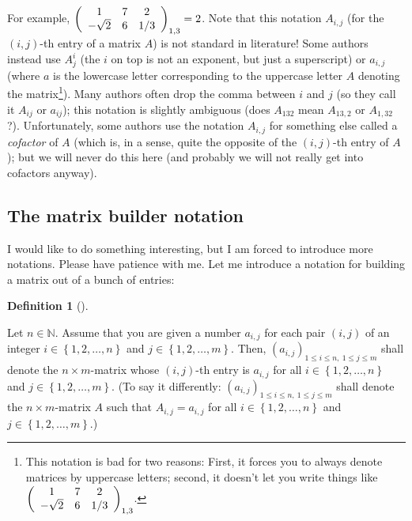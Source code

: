 \documentclass[numbers=enddot,12pt,final,onecolumn,notitlepage]{scrartcl}%
\theoremstyle{definition}
\newtheorem{defi}[theo]{Definition}
\newenvironment{definition}[1][]
{\begin{defi}[#1]\begin{leftbar}}
{\end{leftbar}\end{defi}}
\begin{document}
For example, $\left(
\begin{array}
[c]{ccc}%
1 & 7 & 2\\
-\sqrt{2} & 6 & 1/3
\end{array}
\right)  _{1,3}=2$. Note that this notation $A_{i,j}$ (for the $\left(
i,j\right)  $-th entry of a matrix $A$) is not standard in literature! Some
authors instead use $A_{j}^{i}$ (the $i$ on top is not an exponent, but just a
superscript) or $a_{i,j}$ (where $a$ is the lowercase letter corresponding to
the uppercase letter $A$ denoting the matrix\footnote{This notation is bad for
two reasons: First, it forces you to always denote matrices by uppercase
letters; second, it doesn't let you write things like $\left(
\begin{array}
[c]{ccc}%
1 & 7 & 2\\
-\sqrt{2} & 6 & 1/3
\end{array}
\right)  _{1,3}$.}). Many authors often drop the comma between $i$ and $j$ (so
they call it $A_{ij}$ or $a_{ij}$); this notation is slightly ambiguous (does
$A_{132}$ mean $A_{13,2}$ or $A_{1,32}$ ?). Unfortunately, some authors use
the notation $A_{i,j}$ for something else called a \textit{cofactor} of $A$
(which is, in a sense, quite the opposite of the $\left(  i,j\right)  $-th
entry of $A$); but we will never do this here (and probably we will not really
get into cofactors anyway).

\subsection{The matrix builder notation}

I would like to do something interesting, but I am forced to introduce more
notations. Please have patience with me. Let me introduce a notation for
building a matrix out of a bunch of entries:

\begin{definition}
Let $n\in\mathbb{N}$. Assume that you are given a number $a_{i,j}$ for each
pair $\left(  i,j\right)  $ of an integer $i\in\left\{  1,2,\ldots,n\right\}
$ and $j\in\left\{  1,2,\ldots,m\right\}  $. Then, $\left(  a_{i,j}\right)
_{1\leq i\leq n,\ 1\leq j\leq m}$ shall denote the $n\times m$-matrix whose
$\left(  i,j\right)  $-th entry is $a_{i,j}$ for all $i\in\left\{
1,2,\ldots,n\right\}  $ and $j\in\left\{  1,2,\ldots,m\right\}  $. (To say it
differently: $\left(  a_{i,j}\right)  _{1\leq i\leq n,\ 1\leq j\leq m}$ shall
denote the $n\times m$-matrix $A$ such that $A_{i,j}=a_{i,j}$ for all
$i\in\left\{  1,2,\ldots,n\right\}  $ and $j\in\left\{  1,2,\ldots,m\right\}
$.)
\end{definition}
\end{document}
